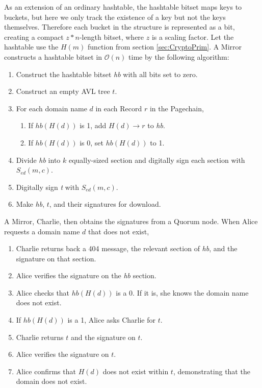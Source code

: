 As an extension of an ordinary hashtable, the hashtable bitset maps keys to buckets, but here we only track the existence of a key but not the keys themselves. Therefore each bucket in the structure is represented as a bit, creating a compact $ z * n $-length bitset, where $ z $ is a scaling factor. Let the hashtable use the $ H(m) $ function from section \ref{sec:CryptoPrim}. A Mirror constructs a hashtable bitset in $ \mathcal{O}(n) $ time by the following algorithm:

\begin{enumerate}
	\item Construct the hashtable bitset \emph{hb} with all bits set to zero.
	\item Construct an empty AVL tree $ t $.
	\item For each domain name $ d $ in each Record $ r $ in the Pagechain,
		\begin{enumerate}
			\item If $ \mathit{hb}(H(d)) $ is 1, add $ H(d) \rightarrow r $ to \emph{hb}.
			\item If $ \mathit{hb}(H(d)) $ is 0, set $ \mathit{hb}(H(d)) $ to 1.
		\end{enumerate}
	\item Divide \emph{hb} into $ k $ equally-sized section and digitally sign each section with $ S_{\mathit{ed}}(m, c) $.
	\item Digitally sign \emph{t} with $ S_{\mathit{ed}}(m, c) $.
	\item Make \emph{hb}, $ t $, and their signatures for download.
\end{enumerate}

A Mirror, Charlie, then obtains the signatures from a Quorum node. When Alice requests a domain name $ d $ that does not exist,

\begin{enumerate}
	\item Charlie returns back a 404 message, the relevant section of \emph{hb}, and the signature on that section.
	\item Alice verifies the signature on the \emph{hb} section.
	\item Alice checks that $ \mathit{hb}(H(d)) $ is a 0. If it is, she knows the domain name does not exist.
	\item If $ \mathit{hb}(H(d)) $ is a 1, Alice asks Charlie for $ t $.
	\item Charlie returns $ t $ and the signature on $ t $.
	\item Alice verifies the signature on $ t $.
	\item Alice confirms that $ H(d) $ does not exist within $ t $, demonstrating that the domain does not exist.
\end{enumerate}

